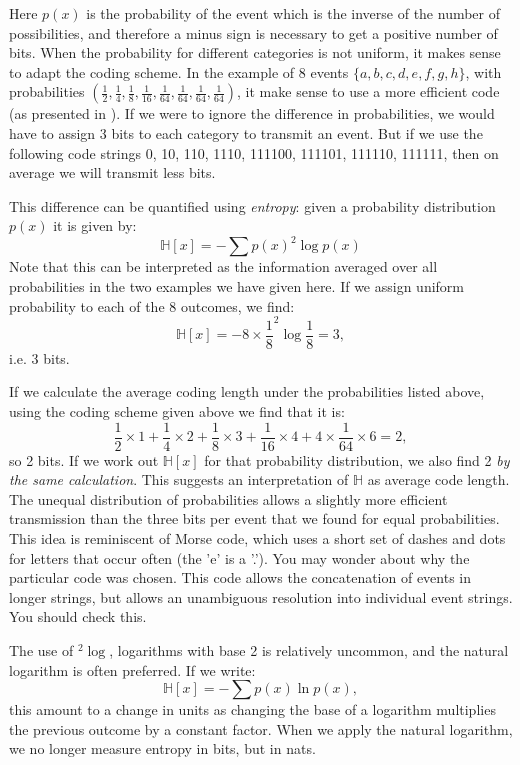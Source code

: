 Here $p(x)$ is the probability of the event which is the inverse of the number of possibilities, and therefore a minus sign is necessary to get a positive number of bits.
When the probability for different categories is not uniform, it makes sense to adapt the coding scheme.  In the example of 8 events $\{a, b, c, d, e,f, g, h\}$,
with probabilities $(\frac{1}{2}, \frac{1}{4}, \frac{1}{8}, \frac{1}{16}, \frac{1}{64}, \frac{1}{64}, \frac{1}{64}, \frac{1}{64} )$, it make sense to use
a more efficient code \cite{cover1999} (as presented in \cite{bishop2006}). If we were to ignore the difference in probabilities, we would have to assign 3 bits to each category
to transmit an event. But if we use the following code strings 0, 10, 110, 1110, 111100, 111101, 111110, 111111, then on average we will transmit less bits.

This difference can be quantified using \emph{entropy}: given a probability distribution $p(x)$ it is given by:
\begin{equation}
  \mathbb{H}[x] = - \sum p(x) ^2\log p(x)
\end{equation}
Note that this can be interpreted as the information averaged over all probabilities in the two examples we have given here. If we  assign uniform probability to
each of the 8 outcomes, we find:
$$
\mathbb{H}[x] = - 8 \times \frac{1}{8} ^2 \log \frac{1}{8} = 3,
$$
i.e. 3 bits.

If we calculate the average coding length under the probabilities listed above, using the coding scheme given above we find that it is:
$$
\frac{1}{2} \times 1 + \frac{1}{4} \times 2 + \frac{1}{8} \times 3 + \frac{1}{16} \times 4 + 4 \times \frac{1}{64} \times 6 = 2,
$$
so 2 bits.
If we work out $\mathbb{H}[x]$ for that probability distribution, we also find 2 \emph{by the same calculation}.
This suggests an interpretation of $\mathbb{H}$ as average code length.
The unequal distribution of probabilities allows a slightly more efficient transmission than the three bits per event that we found for equal probabilities. This idea
is reminiscent of Morse code, which uses a short set of dashes and dots for letters that occur often (the 'e' is a '.'). 
You may wonder about why the particular code was chosen. This code allows the concatenation of events in longer strings, but allows an unambiguous resolution into
individual event strings. You should check this.

The use of $^2 \log$, logarithms with base 2 is relatively uncommon, and the natural logarithm is often preferred. If we write:
$$
\mathbb{H}[x] = -\sum  p(x) \ln p(x),
$$ 
this amount to a change in units as changing the base of a logarithm multiplies the previous outcome by a constant factor. When we apply the natural logarithm, we no longer
measure entropy in bits, but in nats.

